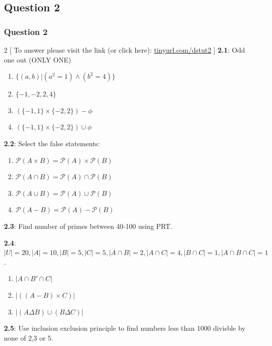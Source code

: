 \documentclass[xcolor=svgnames]{beamer}
\begin{document}
\subsection{Question 2}
\begin{frame}
\frametitle{Question 2}
\begin{multicols}{2}
[
To answer please visit the link (or click here): \href{https://tinyurl.com/dstut2}{\underline{tinyurl.com/dstut2}}
]
\textbf{2.1}: Odd one out (ONLY ONE)
\begin{enumerate}
    \item $\{(a,b) | (a^2 = 1) \land (b^2 = 4)\}$
    \item $\{-1,-2,2,4\}$
    \item $(\{-1,1\} \times \{-2,2\}) - \phi$
    \item $(\{-1,1\} \times \{-2,2\}) \cup \phi$
\end{enumerate}

\textbf{2.2}: Select the false statements:
\begin{enumerate}
    \item $\mathcal{P}(A \times B) = \mathcal{P}(A) \times \mathcal{P}(B)$
    \item $\mathcal{P}(A \cap B) = \mathcal{P}(A) \cap \mathcal{P}(B)$
    \item $\mathcal{P}(A \cup B) = \mathcal{P}(A) \cup \mathcal{P}(B)$
    \item $\mathcal{P}(A - B) = \mathcal{P}(A) - \mathcal{P}(B)$
\end{enumerate}
\textbf{2.3}: Find number of primes between 40-100 using PRT.
\vspace{2.5cm}

\textbf{2.4}: $|U| = 20, |A| = 10, |B| = 5, |C| = 5, |A \cap B| = 2, |A \cap C| = 4, |B \cap C| = 1, |A \cap B \cap C| = 1$.
\begin{enumerate}
    \item $|A \cap B' \cap C| $
    \item $|((A - B) \times C)|$
    \item $|(A \Delta B) \cup (B \Delta C) |$
\end{enumerate}

\textbf{2.5}: Use inclusion exclusion principle to find numbers less than 1000 divisble by none of 2,3 or 5.

\end{multicols}
\end{frame}
\end{document}
